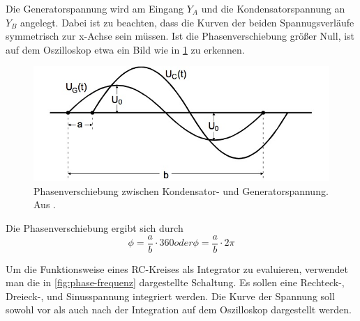 Die Generatorspannung wird am Eingang $Y_A$ und die Kondensatorspannung an $Y_B$ angelegt. Dabei ist zu beachten, dass die Kurven der beiden Spannugsverläufe symmetrisch zur x-Achse sein müssen.
Ist die Phasenverschiebung größer Null, ist auf dem Oszilloskop etwa ein Bild wie in \ref{fig:phasenverschiebung} zu erkennen.

\begin{figure}
  \centering
  \includegraphics[scale=0.5]{content/Phasenverschiebung.jpg}
  \caption{Phasenverschiebung zwischen Kondensator- und Generatorspannung. Aus \cite{anleitung353}.}
  \label{fig:phasenverschiebung}
\end{figure}

Die Phasenverschiebung ergibt sich durch
\begin{equation}
  \phi = \frac{a}{b} \cdot 360 oder \phi = \frac{a}{b} \cdot 2\pi
\end{equation}

Um die Funktionsweise eines RC-Kreises als Integrator zu evaluieren, verwendet man die in \ref{fig:phase-frequenz} dargestellte Schaltung. Es sollen eine Rechteck-, Dreieck-, und Sinusspannung integriert werden. Die Kurve der Spannung soll sowohl vor als auch nach der Integration auf dem Oszilloskop dargestellt werden.
